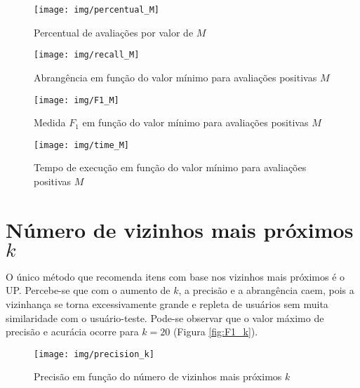 \begin{figure}[htp]
    \begin{center}
    \texttt{[image: img/percentual\_M]}
    \end{center}
    \caption{Percentual de avaliações por valor de $M$}
    \label{fig:percentual_M}
\end{figure}

\begin{figure}[htp]
    \begin{center}
    \texttt{[image: img/recall\_M]}
    \end{center}
    \caption{Abrangência em função do valor mínimo para avaliações positivas $M$}
    \label{fig:recall_M}
\end{figure}

\begin{figure}[htp]
    \begin{center}
    \texttt{[image: img/F1\_M]}
    \end{center}
    \caption{Medida $F_1$ em função do valor mínimo para avaliações positivas $M$}
    \label{fig:F1_M}
\end{figure}

\begin{figure}[htp]
    \begin{center}
    \texttt{[image: img/time\_M]}
    \end{center}
    \caption{Tempo de execução em função do valor mínimo para avaliações positivas $M$}
    \label{fig:time_M}
\end{figure}

\section{Número de vizinhos mais próximos $k$} %
\label{sec:n_mero_de_vizinhos_mais_pr_ximos_}

O único método que recomenda itens com base nos vizinhos mais próximos é o UP. Percebe-se que com o aumento de $k$, a precisão e a abrangência caem, pois a vizinhança se torna excessivamente grande e repleta de usuários sem muita similaridade com o usuário-teste. Pode-se observar que o valor máximo de precisão e acurácia ocorre para $k=20$ (Figura \ref{fig:F1_k}).

\begin{figure}[htp]
    \begin{center}
    \texttt{[image: img/precision\_k]}
    \end{center}
    \caption{Precisão em função do número de vizinhos mais próximos $k$}
    \label{fig:precision_k}
\end{figure}


